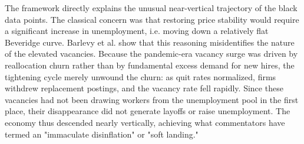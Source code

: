 \documentclass[dvipsnames,11pt]{article}
\begin{document}
\begin{enumerate}
\begin{solution}
                        The framework directly explains the unusual near-vertical trajectory of the black data points. The classical concern \parencite{blanchard2022bad} was that restoring price stability would require a significant increase in unemployment, i.e. moving down a relatively flat Beveridge curve. Barlevy et al. show that this reasoning misidentifies the nature of the elevated vacancies. Because the pandemic-era vacancy surge was driven by reallocation churn rather than by fundamental excess demand for new hires, the tightening cycle merely unwound the churn: as quit rates normalized, firms withdrew replacement postings, and the vacancy rate fell rapidly. Since these vacancies had not been drawing workers from the unemployment pool in the first place, their disappearance did not generate layoffs or raise unemployment. The economy thus descended nearly vertically, achieving what commentators have termed an "immaculate disinflation" or "soft landing."

                \end{solution}
            
        \end{enumerate}

\printbibliography
\end{document}
